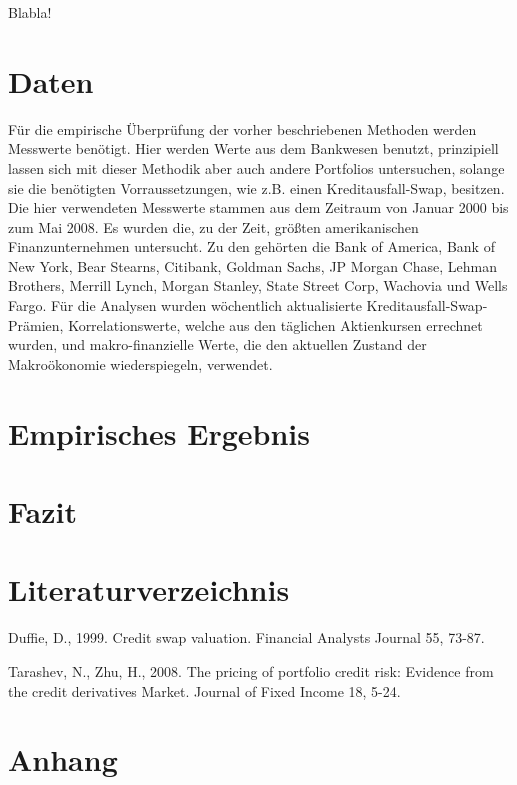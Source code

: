 \documentclass[a4paper,12pt]{scrartcl}
\begin{document}
Blabla!
\newpage
\section{Daten}
Für die empirische Überprüfung der vorher beschriebenen Methoden werden Messwerte benötigt. Hier werden Werte aus dem Bankwesen benutzt, prinzipiell lassen sich mit dieser Methodik aber auch andere Portfolios untersuchen, solange sie die benötigten Vorraussetzungen, wie z.B. einen Kreditausfall-Swap, besitzen. 
Die hier verwendeten Messwerte stammen aus dem Zeitraum von Januar 2000 bis zum Mai 2008. Es wurden die, zu der Zeit, größten amerikanischen Finanzunternehmen untersucht. Zu den gehörten die Bank of America, Bank of New York, Bear Stearns, Citibank, Goldman Sachs, JP Morgan Chase, Lehman Brothers, Merrill Lynch, Morgan Stanley, State Street Corp, Wachovia und Wells Fargo. 
Für die Analysen wurden wöchentlich aktualisierte Kreditausfall-Swap-Prämien, Korrelationswerte, welche aus den täglichen Aktienkursen errechnet wurden, und makro-finanzielle Werte, die den aktuellen Zustand der Makroökonomie wiederspiegeln,  verwendet.

\newpage
\section{Empirisches Ergebnis}
\newpage
\section{Fazit}
\newpage
\section{Literaturverzeichnis}

Duffie, D., 1999. Credit swap valuation. Financial Analysts Journal 55, 73-87.

Tarashev, N., Zhu, H., 2008. The pricing of portfolio credit risk: Evidence from the credit derivatives Market. Journal of Fixed Income 18, 5-24.
\newpage

\section{Anhang}
\end{document}
